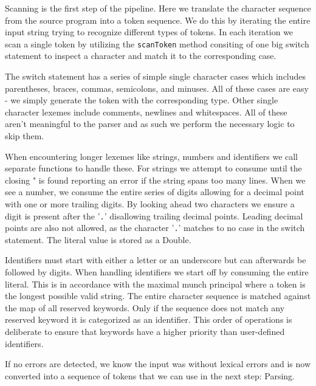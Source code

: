 Scanning is the first step of the pipeline. Here we translate the character sequence from the source program into a token sequence.
We do this by iterating the entire input string trying to recognize different types of tokens.
In each iteration we scan a single token by utilizing the \texttt{scanToken} method consiting of
one big switch statement to inspect a character and match it to the corresponding case.

The switch statement has a series of simple single character cases which
includes parentheses, braces, commas, semicolons, and minuses.
All of these cases are easy - we simply generate the token with the corresponding type.
Other single character lexemes include comments, newlines and whitespaces.
All of these aren't meaningful to the parser and as such we perform the necessary logic to skip them. 


When encountering longer lexemes like strings, numbers and identifiers we call separate functions to handle these.
For strings we attempt to consume until the closing " is found reporting an error if the string spans too many lines.
When we see a number, we consume the entire series of digits allowing for a decimal point with one or more trailing digits.
By looking ahead two characters we ensure a digit is present after the '\texttt{.}' disallowing trailing decimal points.
Leading decimal points are also not allowed, as the character '\texttt{.}' matches to no case in the switch statement.
The literal value is stored as a Double.

Identifiers must start with either a letter or an underscore but can afterwards be followed by digits.
When handling identifiers we start off by consuming the entire literal.
This is in accordance with the maximal munch principal where a token is the longest possible valid string.
The entire character sequence is matched against the map of all reserved keywords.
Only if the sequence does not match any reserved keyword it is categorized as an identifier.
This order of operations is deliberate to ensure that keywords have a higher priority than user-defined identifiers.

If no errors are detected, we know the input was without lexical errors and is now converted into a 
sequence of tokens that we can use in the next step: Parsing.